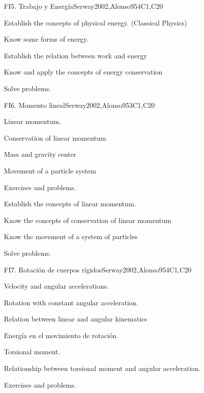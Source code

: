 \begin{syllabus}
\begin{unit}{FI5. Trabajo y Energía}{}{Serway2002,Alonso95}{4}{C1,C20}
   \begin{learningoutcomes}
      \item Establish the concepts of physical energy. (Classical Physics)
      \item Know some forms of energy.
      \item Establish the relation between work and energy
      \item Know and apply the concepts of energy conservation
      \item Solve problems.
   \end{learningoutcomes}
\end{unit}

\begin{unit}{FI6. Momento lineal}{}{Serway2002,Alonso95}{3}{C1,C20}
\begin{topics}
      \item Linear momentum.
      \item Conservation of linear momentum
      \item Mass and gravity center
      \item Movement of a particle system
      \item Exercises and problems.
  \end{topics}

   \begin{learningoutcomes}
      \item Establish the concepts of linear momentum.
      \item Know the concepts of conservation of linear momentum
      \item Know the movement of a system of particles
      \item Solve problems.
   \end{learningoutcomes}
\end{unit}

\begin{unit}{FI7. Rotación de cuerpos rígidos}{}{Serway2002,Alonso95}{4}{C1,C20}
\begin{topics}
      \item Velocity and angular accelerations.
      \item Rotation with constant angular acceleration.
      \item Relation between linear and angular kinematics
      \item Energía en el movimiento de rotación.
      \item Torsional moment.
      \item Relationship between torsional moment and angular acceleration.
      \item Exercises and problems.
   \end{topics}


\end{unit}
\end{syllabus}
